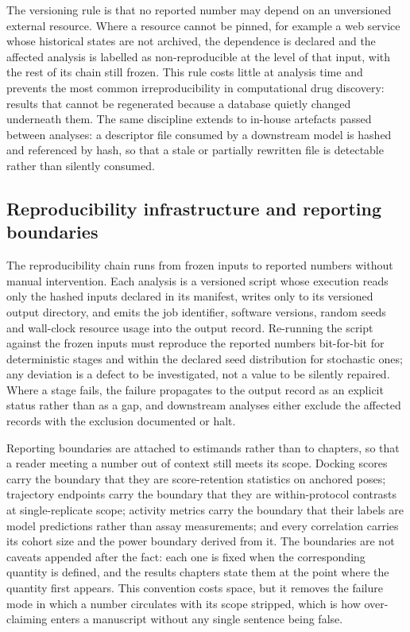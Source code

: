 The versioning rule is that no reported number may depend on an unversioned external resource. Where a resource cannot be pinned, for example a web service whose historical states are not archived, the dependence is declared and the affected analysis is labelled as non-reproducible at the level of that input, with the rest of its chain still frozen. This rule costs little at analysis time and prevents the most common irreproducibility in computational drug discovery: results that cannot be regenerated because a database quietly changed underneath them. The same discipline extends to in-house artefacts passed between analyses: a descriptor file consumed by a downstream model is hashed and referenced by hash, so that a stale or partially rewritten file is detectable rather than silently consumed.

\subsection{Reproducibility infrastructure and reporting boundaries}

The reproducibility chain runs from frozen inputs to reported numbers without manual intervention. Each analysis is a versioned script whose execution reads only the hashed inputs declared in its manifest, writes only to its versioned output directory, and emits the job identifier, software versions, random seeds and wall-clock resource usage into the output record. Re-running the script against the frozen inputs must reproduce the reported numbers bit-for-bit for deterministic stages and within the declared seed distribution for stochastic ones; any deviation is a defect to be investigated, not a value to be silently repaired. Where a stage fails, the failure propagates to the output record as an explicit status rather than as a gap, and downstream analyses either exclude the affected records with the exclusion documented or halt.

Reporting boundaries are attached to estimands rather than to chapters, so that a reader meeting a number out of context still meets its scope. Docking scores carry the boundary that they are score-retention statistics on anchored poses; trajectory endpoints carry the boundary that they are within-protocol contrasts at single-replicate scope; activity metrics carry the boundary that their labels are model predictions rather than assay measurements; and every correlation carries its cohort size and the power boundary derived from it. The boundaries are not caveats appended after the fact: each one is fixed when the corresponding quantity is defined, and the results chapters state them at the point where the quantity first appears. This convention costs space, but it removes the failure mode in which a number circulates with its scope stripped, which is how over-claiming enters a manuscript without any single sentence being false.

